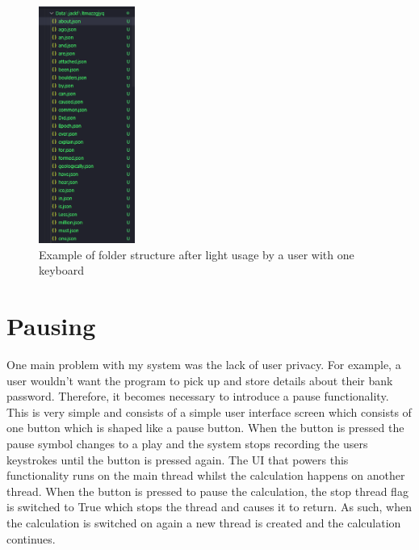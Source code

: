 \documentclass[10pt,a4paper]{report}
\begin{document}
\begin{figure}
	\begin{center}
		\includegraphics[width=0.28\textwidth]{FolderStruct}
	\end{center}
	\caption{Example of folder structure after light usage by a user with one keyboard}
	\label{fig:foldStruct}
\end{figure}

\section{Pausing}

One main problem with my system was the lack of user privacy. For example, a user wouldn't want the program to pick up and store details about their bank password. Therefore, it becomes necessary to introduce a pause functionality. This is very simple and consists of a simple user interface screen which consists of one button which is shaped like a pause button. When the button is pressed the pause symbol changes to a play and the system stops recording the users keystrokes until the button is pressed again. The UI that powers this functionality runs on the main thread whilst the calculation happens on another thread. When the button is pressed to pause the calculation, the stop thread flag is switched to True which stops the thread and causes it to return. As such, when the calculation is switched on again a new thread is created and the calculation continues.
\end{document}
